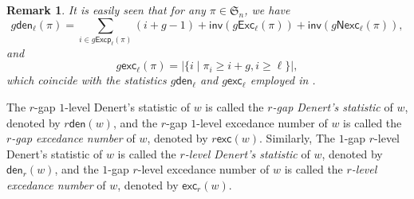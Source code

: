 \documentclass[12pt]{article}
\numberwithin{equation}{section}
\theoremstyle{plain}
\newtheorem{remark}[theorem]{Remark}
\def\exc{\mathsf{exc}}
\def\den{\mathsf{den}}
\def\Exc{\mathsf{Exc}}
\def\Nexc{\mathsf{Nexc}}
\def\Excp{\mathsf{Excp}}
\def\inv{\mathsf{inv}}
\begin{document}
\begin{remark}
It is easily seen that 	for any $\pi \in \mathfrak{S}_n$,   we have
	$$
	g\den_{\ell}(\pi)=\sum\limits_{i\in g\Excp_{\ell}(\pi)} (i+g-1) +{\inv}(g\Exc_{\ell}(\pi))+{\inv}(g\Nexc_{\ell} (\pi)), 
	$$
	and 
	$$
	 g\exc_\ell(\pi)=|\{i\mid \pi_i\geq i+g, i\geq \ell\}|,
	$$
	 which coincide with the statistics $g\den_{\ell}$ and $g\exc_{\ell}$ employed  in \cite{Huang-yan AAM, Liujcta}. 
	\end{remark}


	The $r$-gap $1$-level Denert's statistic    of $w$ is called the {\em     $r$-gap Denert's statistic }  of $w$, denoted by $r\den(w)$,  and the $r$-gap $1$-level excedance number of $w$ is called the {\em $r$-gap excedance number}  of $w$, denoted by $r\exc(w)$.   Similarly,  The $1$-gap $r$-level Denert's statistic    of $w$ is called the {\em     $r$-level Denert's statistic }  of $w$, denoted by $ \den_r(w)$,  and the $1$-gap $r$-level excedance  number of $w$ is called the {\em $r$-level excedance number}  of $w$, denoted by $ \exc_r(w)$.     
	
\end{document}
